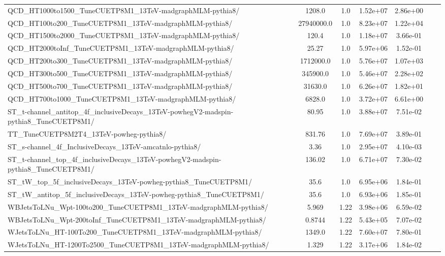 \begin{table}
\begin{center}
{\begin{tabular}{|l|c|c|c|c|c|c|}
QCD\_HT1000to1500\_TuneCUETP8M1\_13TeV-madgraphMLM-pythia8/ & 1208.0 & 1.0 & 1.52e+07 & {\color{red}2.86e+00} \\
QCD\_HT100to200\_TuneCUETP8M1\_13TeV-madgraphMLM-pythia8/ & 27940000.0 & 1.0 & 8.23e+07 & {\color{red}1.22e+04} \\
QCD\_HT1500to2000\_TuneCUETP8M1\_13TeV-madgraphMLM-pythia8/ & 120.4 & 1.0 & 1.18e+07 & {\color{orange}3.66e-01} \\
QCD\_HT2000toInf\_TuneCUETP8M1\_13TeV-madgraphMLM-pythia8/ & 25.27 & 1.0 & 5.97e+06 & 1.52e-01 \\
QCD\_HT200to300\_TuneCUETP8M1\_13TeV-madgraphMLM-pythia8/ & 1712000.0 & 1.0 & 5.76e+07 & {\color{red}1.07e+03} \\
QCD\_HT300to500\_TuneCUETP8M1\_13TeV-madgraphMLM-pythia8/ & 345900.0 & 1.0 & 5.46e+07 & {\color{red}2.28e+02} \\
QCD\_HT500to700\_TuneCUETP8M1\_13TeV-madgraphMLM-pythia8/ & 31630.0 & 1.0 & 6.26e+07 & {\color{red}1.82e+01} \\
QCD\_HT700to1000\_TuneCUETP8M1\_13TeV-madgraphMLM-pythia8/ & 6828.0 & 1.0 & 3.72e+07 & {\color{red}6.61e+00} \\
ST\_t-channel\_antitop\_4f\_inclusiveDecays\_13TeV-powhegV2-madspin-pythia8\_TuneCUETP8M1/ & 80.95 & 1.0 & 3.88e+07 & 7.51e-02 \\
TT\_TuneCUETP8M2T4\_13TeV-powheg-pythia8/ & 831.76 & 1.0 & 7.69e+07 & {\color{orange}3.89e-01} \\
ST\_s-channel\_4f\_InclusiveDecays\_13TeV-amcatnlo-pythia8/ & 3.36 & 1.0 & 2.95e+07 & 4.10e-03 \\
ST\_t-channel\_top\_4f\_inclusiveDecays\_13TeV-powhegV2-madspin-pythia8\_TuneCUETP8M1/ & 136.02 & 1.0 & 6.71e+07 & 7.30e-02 \\
ST\_tW\_top\_5f\_inclusiveDecays\_13TeV-powheg-pythia8\_TuneCUETP8M1/ & 35.6 & 1.0 & 6.95e+06 & 1.84e-01 \\
ST\_tW\_antitop\_5f\_inclusiveDecays\_13TeV-powheg-pythia8\_TuneCUETP8M1/ & 35.6 & 1.0 & 6.93e+06 & 1.85e-01 \\
WBJetsToLNu\_Wpt-100to200\_TuneCUETP8M1\_13TeV-madgraphMLM-pythia8/ & 5.969 & 1.22 & 3.98e+06 & 6.59e-02 \\
WBJetsToLNu\_Wpt-200toInf\_TuneCUETP8M1\_13TeV-madgraphMLM-pythia8/ & 0.8744 & 1.22 & 5.43e+05 & 7.07e-02 \\
WJetsToLNu\_HT-100To200\_TuneCUETP8M1\_13TeV-madgraphMLM-pythia8/ & 1349.0 & 1.22 & 7.60e+07 & {\color{orange}7.80e-01} \\
WJetsToLNu\_HT-1200To2500\_TuneCUETP8M1\_13TeV-madgraphMLM-pythia8/ & 1.329 & 1.22 & 3.17e+06 & 1.84e-02 \\

\end{tabular}}
\end{center}
\end{table}
